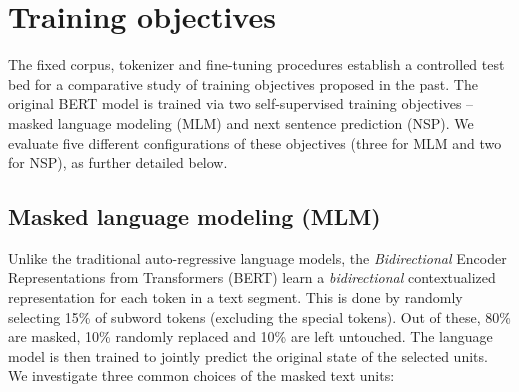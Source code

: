     
    
    \section{Training objectives}
    \label{sec:objectives}
    
    The fixed corpus, tokenizer and fine-tuning procedures establish a controlled test bed for a comparative study of training objectives proposed in the past. The original BERT model is trained via two self-supervised training objectives -- masked language modeling (MLM) and next sentence prediction (NSP). We evaluate five different configurations of these objectives (three for MLM and two for NSP), as further detailed below.  
    
    \subsection{Masked language modeling (MLM)}
    \label{sec:mlm}
    
    Unlike the traditional auto-regressive language models, the \textit{Bidirectional} Encoder Representations from Transformers (BERT) learn a \textit{bidirectional} contextualized representation for each token in a text segment. This is done by randomly selecting 15\% of subword tokens (excluding the special tokens). Out of these, 80\% are masked, 10\% randomly replaced and 10\% are left untouched. The language model is then trained to jointly predict the original state of the selected units. We investigate three common choices of the masked text units:
    
